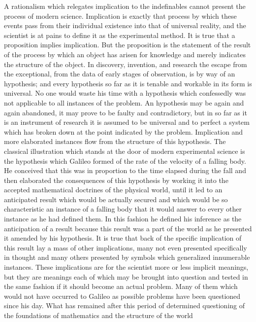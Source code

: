 \documentclass[12pt]{article}
\begin{document}
A rationalism which relegates implication to the
indefinables cannot present the process of modern
science. Implication is exactly that process by which
these events pass from their individual existence into
that of universal reality, and the scientist is at pains
to define it as the experimental method. It is true that
a proposition implies implication. But the proposition
is the statement of the result of the process by which
an object has arisen for knowledge and merely indicates
the structure of the object. In discovery, invention,
and research the escape from the exceptional, from the
data of early stages of observation, is by way of an
hypothesis; and every hypothesis so far as it is tenable
and workable in its form is universal. No one would
waste his time with a hypothesis which confessedly was
not applicable to all instances of the problem. An
hypothesis may be again and again abandoned, it may
prove to be faulty and contradictory, but in so far as
it is an instrument of research it is assumed to be
universal and to perfect a system which has broken
down at the point indicated by the problem. Implication
and more elaborated instances flow from the
structure of this hypothesis. The classical illustration
which stands at the door of modern experimental
science is the hypothesis which Galileo formed of the
rate of the velocity of a falling body. He conceived
that this was in proportion to the time elapsed during
the fall and then elaborated the consequences of this
hypothesis by working it into the accepted mathematical
doctrines of the physical world, until it led to an
anticipated result which would be actually secured and
which would be so characteristic an instance of a falling
body that it would answer to every other instance
as he had defined them. In this fashion he defined his
inference as the anticipation of a result because this
result was a part of the world as he presented it
amended by his hypothesis. It is true that back of the
specific implication of this result lay a mass of other
implications, many not even presented specifically in
thought and many others presented by symbols which
generalized innumerable instances. These implications
are for the scientist more or less implicit meanings, but
they are meanings each of which may be brought into
question and tested in the same fashion if it should become
an actual problem. Many of them which would
not have occurred to Galileo as possible problems have
been questioned since his day. What has remained after
this period of determined questioning of the foundations
of mathematics and the structure of the world
\end{document}
